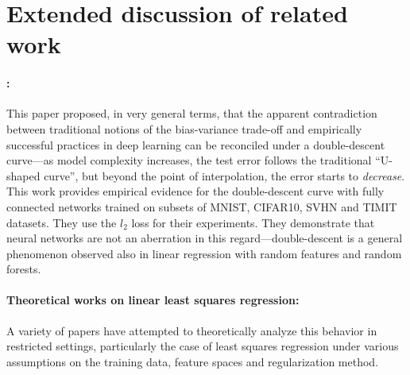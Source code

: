 \section{Extended discussion of related work}
\label{sec:related_appendix}



\paragraph{\cite{belkin2018reconciling}:} 
This paper proposed, in very general terms, that the apparent contradiction between traditional notions of the bias-variance trade-off and empirically successful practices in deep learning can be reconciled under a double-descent curve---as model complexity increases, the test error follows the traditional ``U-shaped curve'', but beyond the point of interpolation, the error starts to \textit{decrease}. This work provides empirical evidence for the double-descent curve with fully connected networks trained on subsets of MNIST, CIFAR10, SVHN and TIMIT datasets. They use the $l_2$ loss for their experiments. They demonstrate that neural networks are not an aberration in this regard---double-descent is a general phenomenon observed also in linear regression with random features and random forests.

\paragraph{Theoretical works on linear least squares regression:}
A variety of papers have attempted to theoretically analyze this behavior in restricted settings, particularly the case of least squares regression under various assumptions on the training data, feature spaces and regularization method.

